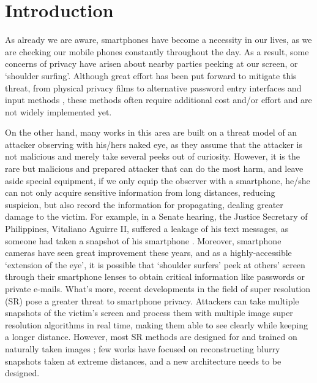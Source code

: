\section{Introduction}
\label{sec-introduction}

As already we are aware, smartphones have become a necessity in our lives, as we are checking our mobile phones constantly throughout the day. As a result, some concerns of privacy have arisen about nearby parties peeking at our screen, or ‘shoulder surfing’. Although great effort has been put forward to mitigate this threat, from physical privacy films to alternative password entry interfaces \cite{wiedenbeck2006design} \cite{papadopoulos2017illusionpin} and input methods \cite{kumar2007reducing}, these methods often require additional cost and/or effort \cite{Chun2019Keep} and are not widely implemented yet.

On the other hand, many works in this area are built on a threat model of an attacker observing with his/hers naked eye, as they assume that the attacker is not malicious and merely take several peeks out of curiosity. However, it is the rare but malicious and prepared attacker that can do the most harm, and leave aside special equipment, if we only equip the observer with a smartphone, he/she can not only acquire sensitive information from long distances, reducing suspicion, but also record the information for propagating, dealing greater damage to the victim. For example, in a Senate hearing, the Justice Secretary of Philippines, Vitaliano Aguirre II, suffered a leakage of his text messages, as someone had taken a snapshot of his smartphone \cite{Polotiko2017leakage}. Moreover, smartphone cameras have seen great improvement these years, and as a highly-accessible ‘extension of the eye’, it is possible that ‘shoulder surfers’ peek at others’ screen through their smartphone lenses to obtain critical information like passwords or private e-mails. What’s more, recent developments in the field of super resolution (SR) pose a greater threat to smartphone privacy. Attackers can take multiple snapshots of the victim’s screen and process them with multiple image super resolution algorithms in real time, making them able to see clearly while keeping a longer distance. However, most SR methods are designed for and trained on naturally taken images \cite{nasrollahi2020deep} \cite{lyn2020image}; few works have focused on reconstructing blurry snapshots taken at extreme distances, and a new architecture needs to be designed.

